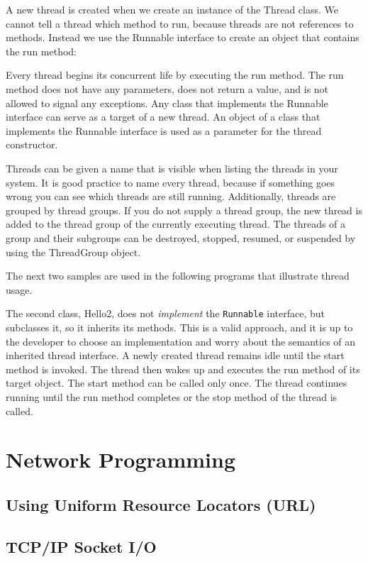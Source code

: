 A new thread is created when we create an instance of the Thread class. We cannot tell a thread which method to run, because threads are not references to methods. Instead we use the Runnable interface to create an object that contains the run method:

Every thread begins its concurrent life by executing the run method. The run method does not have any parameters, does not return a value, and is not allowed to signal any exceptions.
Any class that implements the Runnable interface can serve as a target of a new thread. An object of a class that implements the Runnable interface is used as a parameter for the thread constructor.

Threads can be given a name that is visible when listing the threads in your system. It is good practice to name every thread, because if something goes wrong you can see which threads are still running.
Additionally, threads are grouped by thread groups. If you do not
supply a thread group, the new thread is added to the thread group of
the currently executing thread. The threads of a group and their
subgroups can be destroyed, stopped, resumed, or suspended by using
the ThreadGroup object. 

The next two samples are used in the following programs that
illustrate thread usage.
 
 
The second class, Hello2, does not \emph{implement} the
\texttt{Runnable} interface, but subclasses it, so it inherits its
methods. This is a valid approach, and it is up to the developer to
choose an implementation and worry about the semantics of an inherited
thread interface.
A newly created thread remains idle until the start method is invoked. The thread then wakes up and executes the run method of its target object. The start method can be called only once. The thread continues running until the run method completes or the stop method of the thread is called.



\chapter{Network Programming}
\section{Using Uniform Resource Locators (URL)}
\section{TCP/IP Socket I/O}
